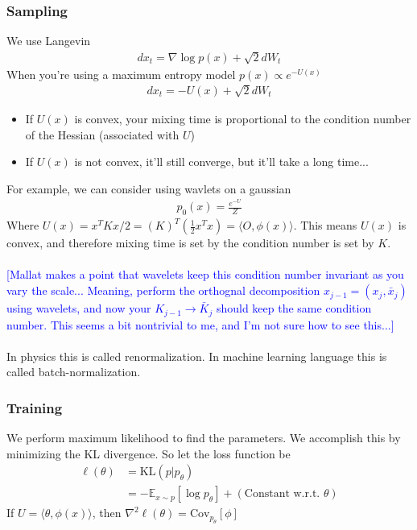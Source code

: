 \subsubsection{Sampling}
We use Langevin 
\begin{align}
	dx_t = \nabla \log p(x) + \sqrt{2} dW_t
\end{align}
When you're using a maximum entropy model $p(x) \propto e^{-U(x)}$
\begin{align}
	dx_t = - U(x) + \sqrt{2}dW_t
\end{align}
\begin{itemize}
	\item If $U(x)$ is convex, your mixing time is proportional to the condition number of the Hessian (associated with $U$)
	\item If $U(x)$ is not convex, it'll still converge, but it'll take a long time...
\end{itemize}
\begin{sidework}
	For example, we can consider using wavlets on a gaussian
	\begin{align}
		p_0(x) = \frac{e^{-U}}{Z}
	\end{align}
	Where $U(x) = x^T K x /2 = (K)^T (\frac{1}{2}x^T x) = \langle O, \phi(x)\rangle$. This means $U(x)$ is convex, and therefore mixing time is set by the condition number is set by $K$. \\
	\\
	\textcolor{blue}{[Mallat makes a point that wavelets keep this condition number invariant as you vary the scale... Meaning, perform the orthognal decomposition $x_{j-1} = (x_j, \bar x_j)$ using wavelets, and now your $K_{j-1} \to \bar K_j$ should keep the same condition number. This seems a bit nontrivial to me, and I'm not sure how to see this...]}\\
	\\
	In physics this is called renormalization. In machine learning language this is called batch-normalization.
\end{sidework}

\subsubsection{Training}
We perform maximum likelihood to find the parameters. We accomplish this by minimizing the KL divergence. 
So let the loss function be
\begin{align}
	\ell(\theta) & = \text{KL}(p |p_\theta)\\
	& = - \mathbb E_{x \sim p}[\log p_\theta] + (\text{Constant w.r.t. }\theta)
\end{align}
If $U = \langle \theta, \phi(x)\rangle$, then $\nabla^2 \ell(\theta) = \text{Cov}_{p_\theta}[\phi]$

